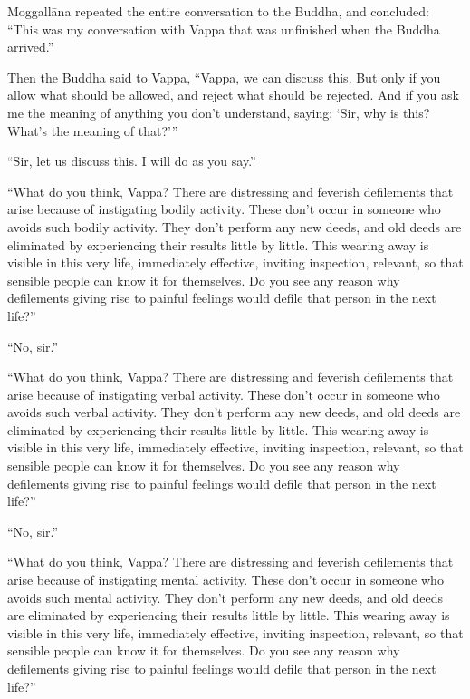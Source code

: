 \documentclass[12pt,openany]{book}%
\begin{document}
\textsanskrit{Moggallāna} repeated the entire conversation to the Buddha, and concluded: “This was my conversation with Vappa that was unfinished when the Buddha arrived.” 

Then the Buddha said to Vappa, “Vappa, we can discuss this. But only if you allow what should be allowed, and reject what should be rejected. And if you ask me the meaning of anything you don’t understand, saying: ‘Sir, why is this? What’s the meaning of that?’” 

“Sir, let us discuss this. I will do as you say.” 

“What do you think, Vappa? There are distressing and feverish defilements that arise because of instigating bodily activity. These don’t occur in someone who avoids such bodily activity. They don’t perform any new deeds, and old deeds are eliminated by experiencing their results little by little. This wearing away is visible in this very life, immediately effective, inviting inspection, relevant, so that sensible people can know it for themselves. Do you see any reason why defilements giving rise to painful feelings would defile that person in the next life?” 

“No, sir.” 

“What do you think, Vappa? There are distressing and feverish defilements that arise because of instigating verbal activity. These don’t occur in someone who avoids such verbal activity. They don’t perform any new deeds, and old deeds are eliminated by experiencing their results little by little. This wearing away is visible in this very life, immediately effective, inviting inspection, relevant, so that sensible people can know it for themselves. Do you see any reason why defilements giving rise to painful feelings would defile that person in the next life?” 

“No, sir.” 

“What do you think, Vappa? There are distressing and feverish defilements that arise because of instigating mental activity. These don’t occur in someone who avoids such mental activity. They don’t perform any new deeds, and old deeds are eliminated by experiencing their results little by little. This wearing away is visible in this very life, immediately effective, inviting inspection, relevant, so that sensible people can know it for themselves. Do you see any reason why defilements giving rise to painful feelings would defile that person in the next life?” 
\end{document}
